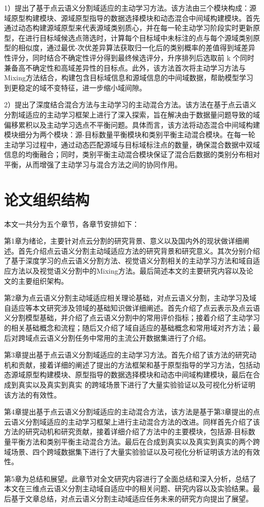 1）提出了基于点云语义分割域适应的主动学习方法。该方法由三个模块构成：源域原型构建模块、源域原型指导的数据选择模块和动态混合中间域构建模块。首先通过动态构建源域原型来代表源域类别质心，并在每一轮主动学习阶段实时更新原型，在进行目标域候选点筛选时，计算每个目标域中未标注的点与每个源域类别原型的相似度，通过最优-次优差异算法获取归一化后的类别概率的差值得到域差异性评分，同时结合不确定性评分得到最终候选评分，升序排列后选取前 k 个同时兼备高不确定性和高域差异性的目标点。此外，该方法首次将主动学习方法与Mixing方法结合，构建包含目标域信息和源域信息的中间域数据，帮助模型学习到更稳定的域不变特征，进一步缩小域间隙。

2）提出了深度结合混合方法与主动学习的主动混合方法。该方法在基于点云语义分割域适应的主动学习框架上进行了深入探索，旨在解决由于数据量问题导致的域偏移累积以及主动学习选点不平衡问题。具体而言，该方法将动态混合中间域构建模块细分为两个模块：源-目标数量平衡模块和类别平衡主动混合模块。在每一轮主动学习过程中，通过动态匹配源域与目标域标注点的数量，确保混合数据中双域信息的均衡融合；同时，类别平衡主动混合模块保证了混合后数据的类别分布相对平衡，从而增强了主动学习与混合方法之间的协同作用。
\section{论文组织结构}
本文一共分为五个章节，各章节安排如下：

第1章为绪论，主要针对点云分割的研究背景、意义以及国内外的现状做详细阐述。首先介绍点云语义分割主动域适应方法的研究背景和研究意义。其次分别介绍了基于深度学习的点云语义分割方法、视觉语义分割相关的主动学习方法和域自适应方法以及视觉语义分割中的Mixing方法。最后简述本文的主要研究内容以及论文的主要组织架构。

第2章为点云语义分割主动域适应相关理论基础，对点云语义分割，主动学习及域自适应等本文研究涉及领域的基础知识做详细阐述。首先介绍了点云表示及点云语义分割模型基础，并介绍了点云语义分割中的常用评价指标；接着介绍了主动学习的相关基础概念和流程；随后又介绍了域自适应的基础概念和常用域对齐方法；最后对跨域点云语义分割任务中常用的主流公开数据集进行了介绍。

第3章提出基于点云语义分割域适应的主动学习方法。首先介绍了该方法的研究动机和贡献，接着详细的阐述了提出的方法框架和基于原型指导的学习方法，包括动态源域原型构建模块、原型指导的数据选择模块和动态中间域构建模块，最后在合成到真实以及真实到真实
的跨域场景下进行了大量实验验证以及可视化分析证明该方法的有效性。

第4章提出基于点云语义分割域适应的主动混合方法，该方法是基于第3章提出的点云语义分割域适应的主动学习框架上进行主动混合方法的改进。同样首先介绍了该方法的研究动机和研究贡献，接着详细介绍了方法中的主要模块，包括源-目标数量平衡方法和类别平衡主动混合方法。最后在合成到真实以及真实到真实的两个跨域场景、四个跨域数据集下进行了大量实验验证以及可视化分析证明该方法的有效性。

第5章为总结和展望。此章节对全文研究内容进行了全面总结和深入分析，总结了本文在三维点云语义分割主动域自适应中的相关问题、研究内容以及实验结果。最后基于文章总结，对点云语义分割主动域适应任务未来的研究方向提出了展望。

\clearpage